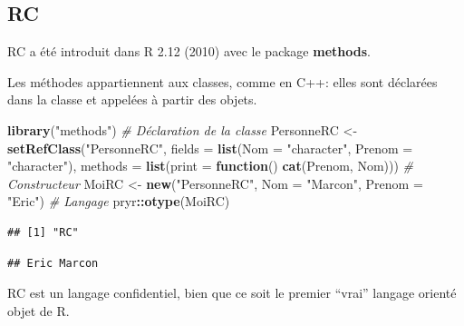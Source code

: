 \documentclass[
  12pt,
  french,
  a4paper,
  extrafontsizes,onecolumn,openright
  ]{memoir}
\newenvironment{Shaded}{\begin{snugshade}}{\end{snugshade}}
\newcommand{\AttributeTok}[1]{\textcolor[rgb]{0.13,0.29,0.53}{#1}}
\newcommand{\CommentTok}[1]{\textcolor[rgb]{0.56,0.35,0.01}{\textit{#1}}}
\newcommand{\ControlFlowTok}[1]{\textcolor[rgb]{0.13,0.29,0.53}{\textbf{#1}}}
\newcommand{\FunctionTok}[1]{\textcolor[rgb]{0.13,0.29,0.53}{\textbf{#1}}}
\newcommand{\NormalTok}[1]{#1}
\newcommand{\OtherTok}[1]{\textcolor[rgb]{0.56,0.35,0.01}{#1}}
\newcommand{\SpecialCharTok}[1]{\textcolor[rgb]{0.81,0.36,0.00}{\textbf{#1}}}
\newcommand{\StringTok}[1]{\textcolor[rgb]{0.31,0.60,0.02}{#1}}
\begin{document}
\subsection{RC}\label{rc}

RC a été introduit dans R 2.12 (2010) avec le package \textbf{methods}.

Les méthodes appartiennent aux classes, comme en C++: elles sont déclarées dans la classe et appelées à partir des objets.

\scriptsize

\begin{Shaded}
\begin{Highlighting}[]
\FunctionTok{library}\NormalTok{(}\StringTok{"methods"}\NormalTok{)}
\CommentTok{\# Déclaration de la classe}
\NormalTok{PersonneRC }\OtherTok{\textless{}{-}} \FunctionTok{setRefClass}\NormalTok{(}\StringTok{"PersonneRC"}\NormalTok{, }
    \AttributeTok{fields =} \FunctionTok{list}\NormalTok{(}\AttributeTok{Nom =} \StringTok{"character"}\NormalTok{, }\AttributeTok{Prenom =} \StringTok{"character"}\NormalTok{),}
    \AttributeTok{methods =} \FunctionTok{list}\NormalTok{(}\AttributeTok{print =} \ControlFlowTok{function}\NormalTok{() }\FunctionTok{cat}\NormalTok{(Prenom, Nom)))}
\CommentTok{\# Constructeur}
\NormalTok{MoiRC }\OtherTok{\textless{}{-}} \FunctionTok{new}\NormalTok{(}\StringTok{"PersonneRC"}\NormalTok{, }\AttributeTok{Nom =} \StringTok{"Marcon"}\NormalTok{, }\AttributeTok{Prenom =} \StringTok{"Eric"}\NormalTok{)}
\CommentTok{\# Langage}
\NormalTok{pryr}\SpecialCharTok{::}\FunctionTok{otype}\NormalTok{(MoiRC)}
\end{Highlighting}
\end{Shaded}

\begin{verbatim}
## [1] "RC"
\end{verbatim}

\begin{Shaded}
\end{Shaded}

\begin{verbatim}
## Eric Marcon
\end{verbatim}

\normalsize

RC est un langage confidentiel, bien que ce soit le premier \enquote{vrai} langage orienté objet de R.
\end{document}
